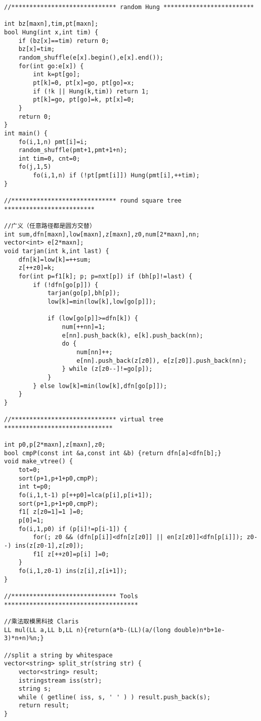 \documentclass[6pt]{article}
\begin{document}
\begin{multicols}{2}
\begin{lstlisting}
//***************************** random Hung *************************

int bz[maxn],tim,pt[maxn];
bool Hung(int x,int tim) {
    if (bz[x]==tim) return 0;
    bz[x]=tim;
    random_shuffle(e[x].begin(),e[x].end());
    for(int go:e[x]) {
        int k=pt[go];
        pt[k]=0, pt[x]=go, pt[go]=x;
        if (!k || Hung(k,tim)) return 1;
        pt[k]=go, pt[go]=k, pt[x]=0;
    }
    return 0;
}
int main() {
    fo(i,1,n) pmt[i]=i;
    random_shuffle(pmt+1,pmt+1+n);
    int tim=0, cnt=0;
    fo(j,1,5)
        fo(i,1,n) if (!pt[pmt[i]]) Hung(pmt[i],++tim);
}

//***************************** round square tree *************************

//广义（任意路径都是圆方交替）
int sum,dfn[maxn],low[maxn],z[maxn],z0,num[2*maxn],nn;
vector<int> e[2*maxn];
void tarjan(int k,int last) {
    dfn[k]=low[k]=++sum;
    z[++z0]=k;
    for(int p=f1[k]; p; p=nxt[p]) if (bh[p]!=last) {
        if (!dfn[go[p]]) {
            tarjan(go[p],bh[p]);
            low[k]=min(low[k],low[go[p]]);

            if (low[go[p]]>=dfn[k]) {
                num[++nn]=1;
                e[nn].push_back(k), e[k].push_back(nn);
                do {
                    num[nn]++;
                    e[nn].push_back(z[z0]), e[z[z0]].push_back(nn);
                } while (z[z0--]!=go[p]);
            }
        } else low[k]=min(low[k],dfn[go[p]]);
    }
}

//***************************** virtual tree ******************************

int p0,p[2*maxn],z[maxn],z0;
bool cmpP(const int &a,const int &b) {return dfn[a]<dfn[b];}
void make_vtree() {
    tot=0;
    sort(p+1,p+1+p0,cmpP);
    int t=p0;
    fo(i,1,t-1) p[++p0]=lca(p[i],p[i+1]);
    sort(p+1,p+1+p0,cmpP);
    f1[ z[z0=1]=1 ]=0;
    p[0]=1;
    fo(i,1,p0) if (p[i]!=p[i-1]) {
        for(; z0 && (dfn[p[i]]<dfn[z[z0]] || en[z[z0]]<dfn[p[i]]); z0--) ins(z[z0-1],z[z0]);
        f1[ z[++z0]=p[i] ]=0;
    }
    fo(i,1,z0-1) ins(z[i],z[i+1]);
}

//***************************** Tools *************************************

//乘法取模黑科技 Claris
LL mul(LL a,LL b,LL n){return(a*b-(LL)(a/(long double)n*b+1e-3)*n+n)%n;}

//split a string by whitespace
vector<string> split_str(string str) {
    vector<string> result;
    istringstream iss(str);
    string s;
    while ( getline( iss, s, ' ' ) ) result.push_back(s);
    return result;
}
\end{lstlisting}


\end{multicols}
\end{document}

